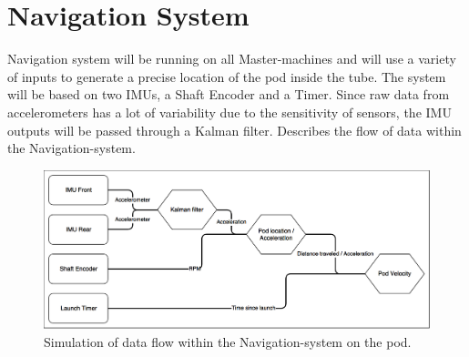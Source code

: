         
\section{Navigation System}
Navigation system will be running on all Master-machines and will use a variety of inputs to generate a precise location of the pod inside the tube. The system will be based on two IMUs, a Shaft Encoder and a Timer. Since raw data from accelerometers has a lot of variability due to the sensitivity of sensors, the IMU outputs will be passed through a Kalman filter.  Describes the flow of data within the Navigation-system.

\begin{figure}
    \centering
    \includegraphics[width=\textwidth]{images/navigation_system.png}
    \caption{Simulation of data flow within the Navigation-system on the pod.}
    \label{fig:navigation-system}
\end{figure}


